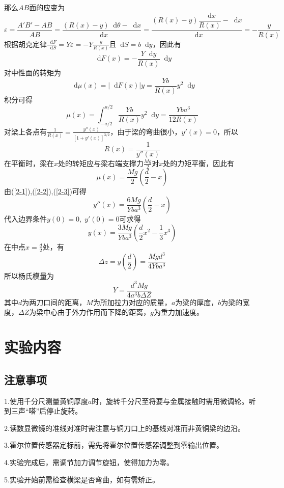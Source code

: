\documentclass[UTF-8,twoside,cs4size]{ctexart}
\newcommand*{\dif}{\mathop{}\!\mathrm{d}}
\begin{document}
	那么$ AB $面的应变为
	\[\varepsilon=\frac{A'B'-AB}{AB}=\frac{(R(x)-y)\dif\theta-\dif x}{\dif x}=\frac{(R(x)-y)\dfrac{\dif x}{R(x)}-\dif x}{\dif x}=-\frac{y}{R(x)}\]
	根据胡克定律$ \frac{\dif F}{\dif S}=Y\varepsilon=-Y\frac{y}{R(x)} $且$ \dif S=b\dif y $，因此有
	\[\dif F(x)=-\frac{Y\dif y}{R(x)}\dif y\]
	对中性面的转矩为
	\begin{equation}\label{2-1}
		\dif\mu(x)=|\dif F(x)|y=\frac{Yb}{R(x)}y^2\dif y
	\end{equation}
	积分可得
	\[\mu(x)=\int_{-a/2}^{a/2}\frac{Yb}{R(x)}y^2\dif y=\frac{Yba^3}{12R(x)}\]
	对梁上各点有$ \frac{1}{R(x)}=\frac{y''(x)}{[1+y'(x)]^{3/2}} $，由于梁的弯曲很小，$ y'(x)=0 $，所以
	\begin{equation}\label{2-2}
		R(x)=\frac{1}{y''(x)}
	\end{equation}
	在平衡时，梁在$ x $处的转矩应与梁右端支撑力$ \frac{Mg}{2} $对$ x $处的力矩平衡，因此有
	\begin{equation}\label{2-3}
		\mu(x)=\frac{Mg}{2}\left(\frac d2-x\right)
	\end{equation}
	由(\ref{2-1}),(\ref{2-2}),(\ref{2-3})可得
	\[y''(x)=\frac{6Mg}{Yba^3}\left(\frac d2-x\right)\]
	代入边界条件$ y(0)=0,\;y'(0)=0 $可求得
	\[y(x)=\frac{3Mg}{Yba^3}\left(\frac d2x^2-\frac13x^3\right)\]
	在中点$ x=\frac d2 $处，有
	\[\Delta z=y\left(\frac d2\right)=\frac{Mgd^3}{4Yba^3}\]
	所以杨氏模量为
	\begin{equation}\label{2}
		Y=\frac{d^3Mg}{4a^3b\Delta Z}
	\end{equation}
	其中$ d $为两刀口间的距离，$ M $为所加拉力对应的质量，$ a $为梁的厚度，$ b $为梁的宽度，$ \Delta Z $为梁中心由于外力作用而下降的距离，$ g $为重力加速度。
	
	\section{实验内容}
	\subsection{注意事项}
	1.使用千分尺测量黄铜厚度$ a $时，旋转千分尺至将要与金属接触时需用微调轮。听到三声“嗒”后停止旋转。
	
	2.读数显微镜的准线对准时需注意与铜刀口上的基线对准而非黄铜梁的边沿。
	
	3.霍尔位置传感器定标前，需先将霍尔位置传感器调整到零输出位置。
	
	4.实验完成后，需调节加力调节旋钮，使得加力为零。
	
	5.实验开始前需检查横梁是否弯曲，如有需矫正。
	
\end{document}

